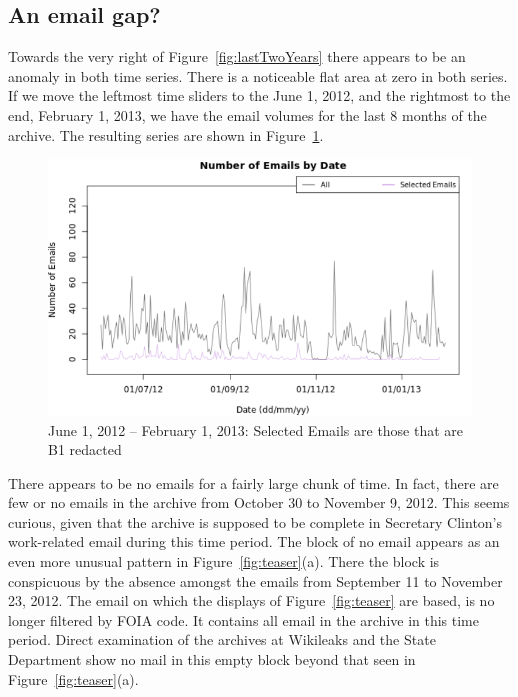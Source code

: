 \documentclass[journal]{vgtc}                %
\begin{document}
\subsection{An email gap?}
\label{sect:emailGap}
Towards the very right of Figure~\ref{fig:lastTwoYears} there appears to be an anomaly in both time series.  There is a noticeable flat area at zero in both series.  If we move the leftmost time sliders to the June 1, 2012, and the rightmost to the end, February 1, 2013, we have the email volumes for the last 8 months of the archive.  The resulting series are shown in Figure~\ref{fig:EmailVolumeB1Jun1On}.
\begin{figure}[h]
\begin{center}
\includegraphics[width=0.95\linewidth]{EmailVolumeB1Jun1On}
\caption{June 1, 2012 -- February 1, 2013:  Selected Emails are those that are B1 redacted}
\label{fig:EmailVolumeB1Jun1On}
\end{center}
\end{figure}
There appears to be no emails for a fairly large chunk of time.  In fact, there are few or no emails in the archive from October 30 to November 9, 2012.  This seems curious, given that the archive is supposed to be complete in Secretary Clinton's work-related email during this time period.  
The block of no email appears as an even more unusual pattern in Figure~\ref{fig:teaser}(a).  There the block is conspicuous by the absence amongst the emails from September 11 to November 23, 2012.  The email on which the displays of Figure~\ref{fig:teaser} are based, is no longer filtered by FOIA code.  It contains all email in the archive in this time period.  Direct examination of the archives at Wikileaks and the State Department show no mail in this empty block beyond that seen in Figure~\ref{fig:teaser}(a).
\end{document}
